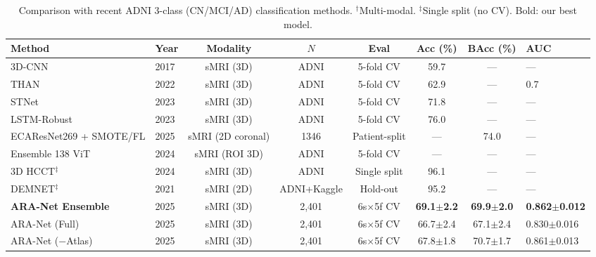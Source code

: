 \begin{table}[ht]
\centering
\small
\caption{Comparison with recent ADNI 3-class (CN/MCI/AD) classification methods. $^\dagger$Multi-modal. $^\ddagger$Single split (no CV). Bold: our best model.}
\label{tab:sota}
\begin{tabular}{llcccccl}
\toprule
Method & Year & Modality & $N$ & Eval & Acc (\%) & BAcc (\%) & AUC \\
\midrule
  3D-CNN & 2017 & sMRI (3D) & ADNI & 5-fold CV & 59.7 & — & — \\
  THAN & 2022 & sMRI (3D) & ADNI & 5-fold CV & 62.9 & — & 0.7 \\
  STNet & 2023 & sMRI (3D) & ADNI & 5-fold CV & 71.8 & — & — \\
  LSTM-Robust & 2023 & sMRI (3D) & ADNI & 5-fold CV & 76.0 & — & — \\
  ECAResNet269 + SMOTE/FL & 2025 & sMRI (2D coronal) & 1346 & Patient-split & — & 74.0 & — \\
  Ensemble 138 ViT & 2024 & sMRI (ROI 3D) & ADNI & 5-fold CV & — & — & — \\
  3D HCCT$^\ddagger$ & 2024 & sMRI (3D) & ADNI & Single split & 96.1 & — & — \\
  DEMNET$^\ddagger$ & 2021 & sMRI (2D) & ADNI+Kaggle & Hold-out & 95.2 & — & — \\
\midrule
  \textbf{ARA-Net Ensemble} & 2025 & sMRI (3D) & 2,401 & 6s$\times$5f CV & \textbf{69.1$\pm$2.2} & \textbf{69.9$\pm$2.0} & \textbf{0.862$\pm$0.012} \\
  ARA-Net (Full) & 2025 & sMRI (3D) & 2,401 & 6s$\times$5f CV & 66.7$\pm$2.4 & 67.1$\pm$2.4 & 0.830$\pm$0.016 \\
  ARA-Net ($-$Atlas) & 2025 & sMRI (3D) & 2,401 & 6s$\times$5f CV & 67.8$\pm$1.8 & 70.7$\pm$1.7 & 0.861$\pm$0.013 \\
\bottomrule
\end{tabular}
\end{table}